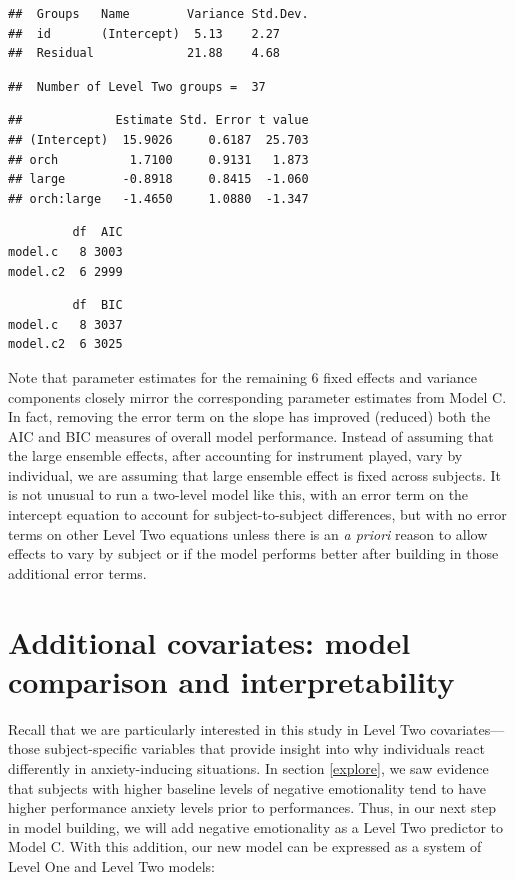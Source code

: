 \documentclass[
]{krantz}
\begin{document}
\begin{verbatim}
##  Groups   Name        Variance Std.Dev.
##  id       (Intercept)  5.13    2.27    
##  Residual             21.88    4.68
\end{verbatim}

\begin{verbatim}
##  Number of Level Two groups =  37
\end{verbatim}

\begin{verbatim}
##             Estimate Std. Error t value
## (Intercept)  15.9026     0.6187  25.703
## orch          1.7100     0.9131   1.873
## large        -0.8918     0.8415  -1.060
## orch:large   -1.4650     1.0880  -1.347
\end{verbatim}

\begin{verbatim}
         df  AIC
model.c   8 3003
model.c2  6 2999
\end{verbatim}

\begin{verbatim}
         df  BIC
model.c   8 3037
model.c2  6 3025
\end{verbatim}

Note that parameter estimates for the remaining 6 fixed effects and variance components closely mirror the corresponding parameter estimates from Model C. In fact, removing the error term on the slope has improved (reduced) both the AIC and BIC measures of overall model performance. Instead of assuming that the large ensemble effects, after accounting for instrument played, vary by individual, we are assuming that large ensemble effect is fixed across subjects. It is not unusual to run a two-level model like this, with an error term on the intercept equation to account for subject-to-subject differences, but with no error terms on other Level Two equations unless there is an \emph{a priori} reason to allow effects to vary by subject or if the model performs better after building in those additional error terms.

\hypertarget{sec:modeld}{%
\section{Additional covariates: model comparison and interpretability}\label{sec:modeld}}

Recall that we are particularly interested in this study in Level Two covariates---those subject-specific variables that provide insight into why individuals react differently in anxiety-inducing situations. In section \ref{explore}, we saw evidence that subjects with higher baseline levels of negative emotionality tend to have higher performance anxiety levels prior to performances. Thus, in our next step in model building, we will add negative emotionality as a Level Two predictor to Model C. With this addition, our new model can be expressed as a system of Level One and Level Two models:
\end{document}
